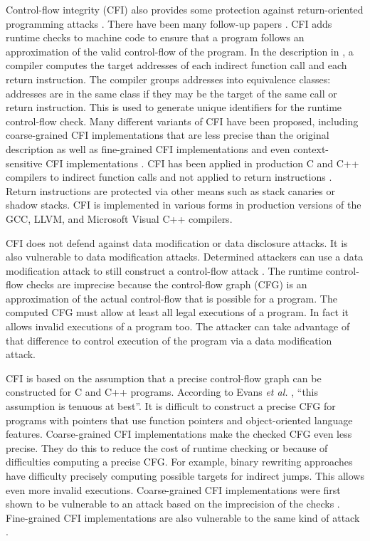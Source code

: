 Control-flow integrity (CFI) also provides some protection
against return-oriented programming attacks \cite{Abadi2005}.  There
have been many follow-up papers \cite{Akritidis2008, Li2011, Li2010, Mashtizadeh2015,
NiuPLDI2014, NiuCCS2014, Niu2015, Sadeghi2015, Tice2014, 
vanderVeen2015, Wang2015, Wang2010, Zeng2011, ZhangSP2013,Zhang2015, ZhangSEC2013}.
CFI adds runtime checks to machine code to ensure
that a program follows an approximation of the valid control-flow of the program. 
In the description in \cite{Abadi2005}, a compiler computes the target addresses of each 
indirect  function call and each return instruction.  The
compiler groups addresses into equivalence classes: addresses are in the same 
class if they may be the target of the same call or return instruction.  This is
used to generate unique identifiers for the runtime control-flow check. 
Many different variants of CFI have been proposed, including coarse-grained CFI
implementations that are less precise than the original description \cite{Wang2015,
ZhangSP2013, ZhangSEC2013} 
as well as fine-grained CFI implementations \cite{Tice2014,Wang2010} 
and even context-sensitive CFI implementations \cite{vanderVeen2015}.
CFI has been applied in production C and C++ compilers to indirect function
calls and not applied to return instructions
\cite{GCCCFG2016,LLVMCFG2016,MicrosoftCFG2016, Tice2014}.   Return instructions
are protected via other means such as stack canaries or shadow stacks.  
CFI is implemented in various forms in production versions of the
GCC, LLVM, and Microsoft Visual C++ compilers.

CFI does not defend against data modification or data disclosure attacks. 
It is also vulnerable to data modification attacks.  Determined attackers can
use a data modification attack to still construct a control-flow attack
\cite{Carlini2015, Conti2015, Evans2015, Goktas2014}.
The runtime control-flow checks are imprecise because the control-flow graph (CFG)
is an approximation of the actual control-flow that is possible for
a program.  The computed CFG must allow at least all legal executions of a
program. In fact it allows invalid executions of a program too.  The
attacker can take advantage of that difference to control execution of the program
via a data modification attack.

CFI is based on the assumption that a precise control-flow graph can be
constructed for C and C++ programs.  According to Evans {\it et al.} \cite{Evans2015},
``this assumption is tenuous at best''.  It is difficult to construct
a precise CFG for programs with pointers that use function pointers and
object-oriented language features.  Coarse-grained CFI implementations make the
checked CFG even less precise.  They do this to reduce  the cost of runtime checking or 
because of difficulties computing a precise CFG.  For example, binary rewriting
approaches have difficulty precisely computing possible targets for indirect jumps.
This allows even more invalid executions.  Coarse-grained CFI implementations
were  first shown to be vulnerable to an 
attack based on the imprecision of the checks \cite{Carlini2014,Davi2014,Goktas2014}. 
Fine-grained CFI implementations are also vulnerable to the same kind of attack
\cite{Carlini2015,Evans2015}.

